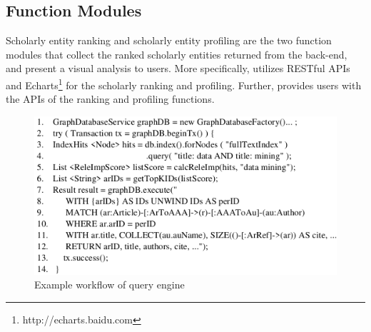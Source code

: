\subsection{Function Modules}
Scholarly entity ranking and scholarly entity profiling are the two function modules that collect the ranked scholarly entities returned from the back-end, and present a visual analysis to users. More specifically, \oursystem utilizes RESTful APIs  and Echarts\footnote{ http://echarts.baidu.com} for the scholarly ranking and profiling. Further, \oursystem provides users with the APIs of the ranking and profiling functions.

\begin{figure}
\centering
\includegraphics[width=\columnwidth]{queryProcess.pdf}
\vspace{-3ex}
\caption{Example workflow of \oursystem query engine}
\label{fig:queryProcess}
\vspace{-2ex}
\end{figure}








